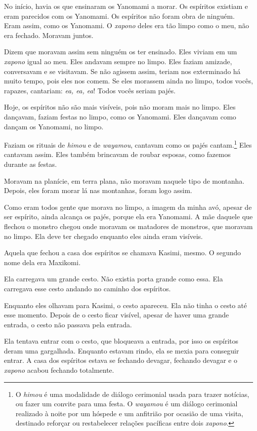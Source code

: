 No início, havia os que ensinaram os Yanomami a morar. Os espíritos
existiam e eram parecidos com os Yanomami. Os espíritos não foram obra
de ninguém. Eram assim, como os Yanomami. O \textit{xapono} deles era tão limpo
como o meu, não era fechado. Moravam juntos. 

Dizem que moravam assim sem ninguém os ter ensinado. Eles viviam em um \textit{xapono}
igual ao meu. Eles andavam sempre no limpo. Eles faziam amizade,
conversavam e se visitavam. Se não agissem assim, teriam nos exterminado
há muito tempo, pois eles nos comem. Se eles morassem ainda no limpo,
todos vocês, rapazes, cantariam: \textit{ea, ea, ea}! Todos vocês seriam
pajés. 

Hoje, os espíritos não são mais visíveis, pois não moram mais no limpo.
Eles dançavam, faziam festas no limpo, como os Yanomami. Eles dançavam
como dançam os Yanomami, no limpo. 

Faziam os rituais de \textit{himou} e de \textit{wayamou}, cantavam como os
pajés cantam.\footnote{O \textit{himou} é uma modalidade de diálogo cerimonial usada para trazer notícias, ou fazer um convite para uma festa. O \textit{wayamou} é um diálogo cerimonial realizado à noite por um hóspede e um anfitrião por ocasião de uma visita, destinado reforçar ou restabelecer relações pacíficas entre dois \textit{xapono}.} Eles cantavam assim. Eles também brincavam de roubar
esposas, como fazemos durante as festas. 

Moravam na planície, em terra plana, não moravam naquele tipo de
montanha. Depois, eles foram morar lá nas montanhas, foram logo assim. 

Como eram todos gente que morava no limpo, a imagem da minha avó, apesar
de ser espírito, ainda alcança os pajés, porque ela era Yanomami. A mãe
daquele que flechou o monstro chegou onde moravam os matadores de
monstros, que moravam no limpo. Ela deve ter chegado enquanto eles ainda
eram visíveis. 

Aquela que fechou a casa dos espíritos se chamava Kasimi, mesmo. O segundo nome dela era Maxikomi. 

Ela carregava um grande cesto. Não existia porta grande como essa. Ela
carregava esse cesto andando no caminho dos espíritos. 

Enquanto eles olhavam para Kasimi, o cesto apareceu. Ela não tinha
o cesto até esse momento. Depois de o cesto ficar visível, apesar de
haver uma grande entrada, o cesto não passava pela entrada. 

Ela tentava entrar com o cesto, que bloqueava a entrada, por isso os
espíritos deram uma gargalhada. Enquanto estavam rindo, ela se mexia
para conseguir entrar. A casa dos espíritos estava se fechando devagar,
fechando devagar e o \textit{xapono} acabou fechando totalmente. 

